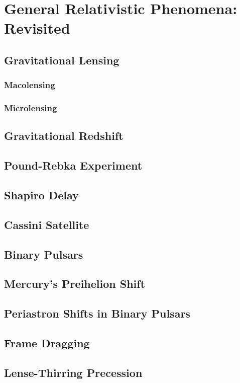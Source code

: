\setchapterpreamble[u]{\margintoc}
\chapter{General Relativistic Phenomena: Revisited}

\section{Gravitational Lensing}
\subsection{Macolensing}
\subsection{Microlensing}

\section{Gravitational Redshift}
\section{Pound-Rebka Experiment}
\section{Shapiro Delay}
\section{Cassini Satellite}
\section{Binary Pulsars}

\section{Mercury's Preihelion Shift}
\section{Periastron Shifts in Binary Pulsars}
\section{Frame Dragging}
\section{Lense-Thirring Precession}
